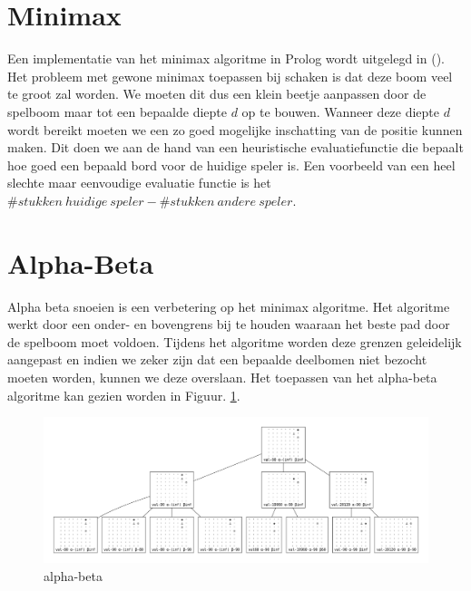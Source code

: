\documentclass[a4paper,10pt]{article}
\begin{document}
\section{Minimax}
Een implementatie van het minimax algoritme in Prolog wordt uitgelegd in (\cite{minimax}).
Het probleem met gewone minimax toepassen bij schaken is dat deze boom veel te groot zal worden.
We moeten dit dus een klein beetje aanpassen door de spelboom maar tot een bepaalde diepte $d$ op te bouwen.
Wanneer deze diepte $d$ wordt bereikt moeten we een zo goed mogelijke inschatting van de positie kunnen maken.
Dit doen we aan de hand van een heuristische evaluatiefunctie die bepaalt hoe goed een bepaald bord voor de huidige speler is.
Een voorbeeld van een heel slechte maar eenvoudige evaluatie functie is het $\# stukken \ huidige \ speler - \# stukken \ andere \ speler$.


\section{Alpha-Beta} 
Alpha beta snoeien is een verbetering op het minimax algoritme.
Het algoritme werkt door een onder- en bovengrens bij te houden waaraan het beste pad door de spelboom moet voldoen.
Tijdens het algoritme worden deze grenzen geleidelijk aangepast en indien we zeker zijn dat een bepaalde deelbomen niet bezocht moeten worden, kunnen we deze overslaan. 
Het toepassen van het alpha-beta algoritme kan gezien worden in Figuur. \ref{fig:alpha-beta}.
\begin{landscape}
    \begin{figure}
    \begin{center}
        \includegraphics[width=\columnwidth]{coolgraph.pdf}
        \caption{alpha-beta}
        \label{fig:alpha-beta}
    \end{center}
\end{figure}
\end{landscape}


\end{document}
